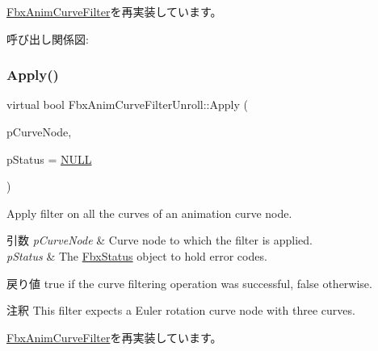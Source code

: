 \hyperlink{class_fbx_anim_curve_filter_a009498a65af4995bf5e5908f17837531}{Fbx\+Anim\+Curve\+Filter}を再実装しています。

呼び出し関係図\+:
\mbox{\label{class_fbx_anim_curve_filter_unroll_a11788f2b59b218d566603fcf3e68cd50}} 
\subsubsection{\texorpdfstring{Apply()}{Apply()}\hspace{0.1cm}{\footnotesize\ttfamily [3/5]}}
{\footnotesize\ttfamily virtual bool Fbx\+Anim\+Curve\+Filter\+Unroll\+::\+Apply (\begin{DoxyParamCaption}\item[{\hyperlink{class_fbx_anim_curve_node}{Fbx\+Anim\+Curve\+Node} \&}]{p\+Curve\+Node,  }\item[{\hyperlink{class_fbx_status}{Fbx\+Status} $\ast$}]{p\+Status = {\ttfamily \hyperlink{fbxarch_8h_a070d2ce7b6bb7e5c05602aa8c308d0c4}{N\+U\+LL}} }\end{DoxyParamCaption})\hspace{0.3cm}{\ttfamily [virtual]}}

Apply filter on all the curves of an animation curve node. 
\begin{DoxyParams}{引数}
{\em p\+Curve\+Node} & Curve node to which the filter is applied. \\
\hline
{\em p\+Status} & The \hyperlink{class_fbx_status}{Fbx\+Status} object to hold error codes. \\
\hline
\end{DoxyParams}
\begin{DoxyReturn}{戻り値}
{\ttfamily true} if the curve filtering operation was successful, {\ttfamily false} otherwise. 
\end{DoxyReturn}
\begin{DoxyRemark}{注釈}
This filter expects a Euler rotation curve node with three curves. 
\end{DoxyRemark}


\hyperlink{class_fbx_anim_curve_filter_ad042b45c0675278fa49e61739b0825c2}{Fbx\+Anim\+Curve\+Filter}を再実装しています。

\mbox{\label{class_fbx_anim_curve_filter_unroll_adcbc56499804749891e0140bd9c9f3f1}} 
